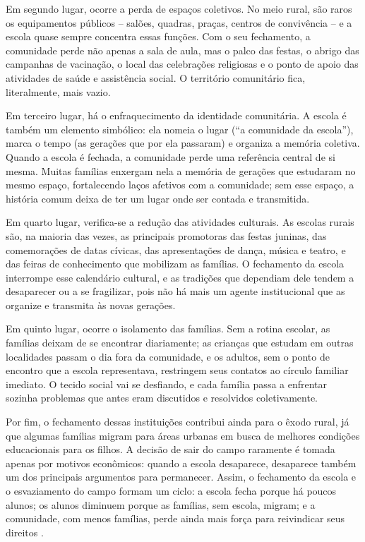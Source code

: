 \documentclass[
  12pt,
  openright,
  twoside,
  a4paper,
  english,
  brazilian,
  sumario=tradicional
]{abntex2}
\begin{document}
Em segundo lugar, ocorre a perda de espaços coletivos. No meio rural, são raros os equipamentos públicos -- salões, quadras, praças, centros de convivência -- e a escola quase sempre concentra essas funções. Com o seu fechamento, a comunidade perde não apenas a sala de aula, mas o palco das festas, o abrigo das campanhas de vacinação, o local das celebrações religiosas e o ponto de apoio das atividades de saúde e assistência social. O território comunitário fica, literalmente, mais vazio.

Em terceiro lugar, há o enfraquecimento da identidade comunitária. A escola é também um elemento simbólico: ela nomeia o lugar (``a comunidade da escola''), marca o tempo (as gerações que por ela passaram) e organiza a memória coletiva. Quando a escola é fechada, a comunidade perde uma referência central de si mesma. Muitas famílias enxergam nela a memória de gerações que estudaram no mesmo espaço, fortalecendo laços afetivos com a comunidade; sem esse espaço, a história comum deixa de ter um lugar onde ser contada e transmitida.

Em quarto lugar, verifica-se a redução das atividades culturais. As escolas rurais são, na maioria das vezes, as principais promotoras das festas juninas, das comemorações de datas cívicas, das apresentações de dança, música e teatro, e das feiras de conhecimento que mobilizam as famílias. O fechamento da escola interrompe esse calendário cultural, e as tradições que dependiam dele tendem a desaparecer ou a se fragilizar, pois não há mais um agente institucional que as organize e transmita às novas gerações.

Em quinto lugar, ocorre o isolamento das famílias. Sem a rotina escolar, as famílias deixam de se encontrar diariamente; as crianças que estudam em outras localidades passam o dia fora da comunidade, e os adultos, sem o ponto de encontro que a escola representava, restringem seus contatos ao círculo familiar imediato. O tecido social vai se desfiando, e cada família passa a enfrentar sozinha problemas que antes eram discutidos e resolvidos coletivamente.

Por fim, o fechamento dessas instituições contribui ainda para o êxodo rural, já que algumas famílias migram para áreas urbanas em busca de melhores condições educacionais para os filhos. A decisão de sair do campo raramente é tomada apenas por motivos econômicos: quando a escola desaparece, desaparece também um dos principais argumentos para permanecer. Assim, o fechamento da escola e o esvaziamento do campo formam um ciclo: a escola fecha porque há poucos alunos; os alunos diminuem porque as famílias, sem escola, migram; e a comunidade, com menos famílias, perde ainda mais força para reivindicar seus direitos \cite{santosbezerra2025}.
\end{document}
